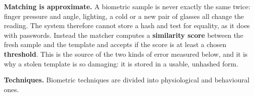 \textbf{Matching is approximate.} A biometric sample is never exactly the same twice: finger pressure and angle, lighting, a cold or a new pair of glasses all change the reading. The system therefore cannot store a hash and test for equality, as it does with passwords. Instead the matcher computes a \textbf{similarity score} between the fresh sample and the template and accepts if the score is at least a chosen \textbf{threshold}. This is the source of the two kinds of error measured below, and it is why a stolen template is so damaging: it is stored in a usable, unhashed form.

\textbf{Techniques.} Biometric techniques are divided into physiological and behavioural ones.
\begin{center}
\end{center}
